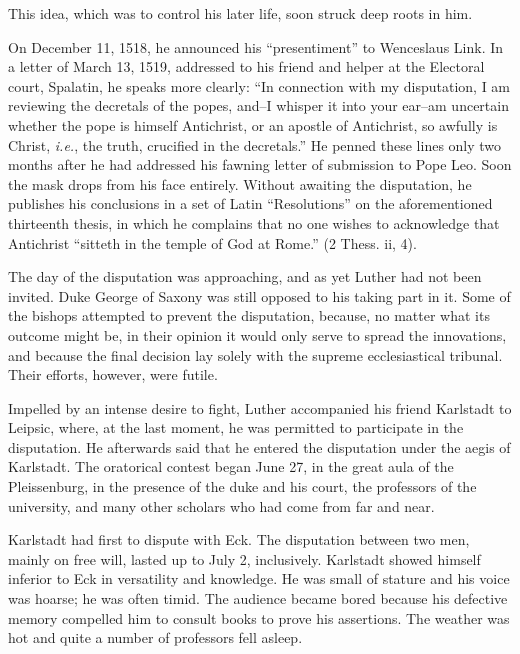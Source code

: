 This idea, which was to control his later life, soon struck deep roots
in him.

On December 11, 1518, he announced his “presentiment” to Wenceslaus
Link. In a letter of March 13, 1519, addressed to his friend and
helper at the Electoral court, Spalatin, he speaks more clearly: “In
connection with my disputation, I am reviewing the decretals of the
popes, and--I whisper it into your ear--am uncertain whether the
pope is himself Antichrist, or an apostle of Antichrist, so awfully is
Christ, \textit{i.e.}, the truth, crucified in the decretals.” He penned these
lines only two months after he had addressed his fawning letter of
submission to Pope Leo. Soon the mask drops from his face entirely.
Without awaiting the disputation, he publishes his conclusions in a
set of Latin “Resolutions” on the aforementioned thirteenth thesis, in
which he complains that no one wishes to acknowledge that Antichrist
“sitteth in the temple of God at Rome.” (2 Thess. ii, 4).

The day of the disputation was approaching, and as yet Luther had
not been invited. Duke George of Saxony was still opposed to his
taking part in it. Some of the bishops attempted to prevent the disputation,
because, no matter what its outcome might be, in their opinion
it would only serve to spread the innovations, and because the final
decision lay solely with the supreme ecclesiastical tribunal. Their
efforts, however, were futile.

Impelled by an intense desire to fight,
Luther accompanied his friend Karlstadt to Leipsic, where, at the
last moment, he was permitted to participate in the disputation.
He afterwards said that he entered the disputation under the aegis
of Karlstadt. The oratorical
contest began June 27, in the great aula of the Pleissenburg, in the
presence of the duke and his court, the professors of the university,
and many other scholars who had come from far and near.

Karlstadt had first to dispute with Eck. The disputation between
two men, mainly on free will, lasted up to July 2, inclusively.
Karlstadt showed himself inferior to Eck in versatility and knowledge.
He was small of stature and his voice was hoarse; he was often
timid. The audience became bored because his defective memory
compelled him to consult books to prove his assertions. The weather
was hot and quite a number of professors fell asleep.

